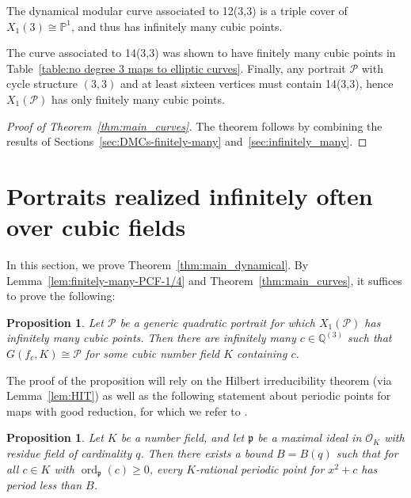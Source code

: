 \documentclass[12pt]{amsart}
\newtheorem{prop}[thm]{Proposition}
\theoremstyle{definition}
\newcommand{\bbP}{\mathbb{P}}
\newcommand{\bbQ}{\mathbb{Q}}
\newcommand{\calO}{\mathcal{O}}
\newcommand{\calP}{\mathcal{P}}
\newcommand{\frakp}{\mathfrak{p}}
\newcommand{\ord}{\operatorname{ord}}
\numberwithin{equation}{section}
\begin{document}
The dynamical modular curve associated to 12(3,3) is a triple cover of $X_1(3) \cong \bbP^1$, and thus has infinitely many cubic points.

The curve associated to 14(3,3) was shown to have finitely many cubic points in Table~\ref{table:no degree 3 maps to elliptic curves}. Finally, any portrait $\calP$ with cycle structure $(3,3)$ and at least sixteen vertices must contain 14(3,3), hence $X_1(\calP)$ has only finitely many cubic points.

\begin{proof}[Proof of Theorem~\ref{thm:main_curves}]
    The theorem follows by combining the results of Sections~\ref{sec:DMCs-finitely-many} and~\ref{sec:infinitely_many}.
\end{proof}

\section{Portraits realized infinitely often over cubic fields}\label{sec:realizations}

In this section, we prove Theorem~\ref{thm:main_dynamical}. By Lemma~\ref{lem:finitely-many-PCF-1/4} and Theorem~\ref{thm:main_curves}, it suffices to prove the following:

\begin{prop}\label{prop:realizing-portraits}
Let $\calP$ be a generic quadratic portrait for which $X_1(\calP)$ has infinitely many cubic points. Then there are infinitely many $c \in \bbQ^{(3)}$ such that $G(f_c, K) \cong \calP$ for some cubic number field $K$ containing $c$.
\end{prop}

The proof of the proposition will rely on the Hilbert irreducibility theorem (via Lemma~\ref{lem:HIT}) as well as the following statement about periodic points for maps with good reduction, for which we refer to \cite[Theorem 2.21]{silverman:2007}.

\begin{prop}\label{prop:good-red}
Let $K$ be a number field, and let $\frakp$ be a maximal ideal in $\calO_K$ with residue field of cardinality $q$. Then there exists a bound $B = B(q)$ such that for all $c \in K$ with $\ord_\frakp(c) \ge 0$, every $K$-rational periodic point for $x^2 + c$ has period less than $B$.
\end{prop}
\end{document}
